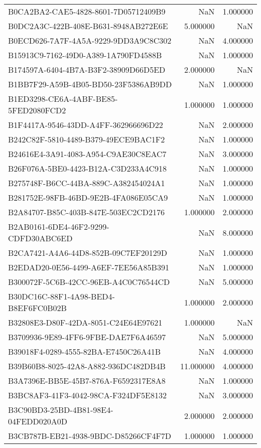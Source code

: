 \begin{tabular}{lrr}
B0CA2BA2-CAE5-4828-8601-7D05712409B9 & NaN & 1.000000 \\
B0DC2A3C-422B-408E-B631-8948AB272E6E & 5.000000 & NaN \\
B0ECD626-7A7F-4A5A-9229-9DD3A9C8C302 & NaN & 4.000000 \\
B15913C9-7162-49D0-A389-1A790FD4588B & NaN & 1.000000 \\
B174597A-6404-4B7A-B3F2-38909D66D5ED & 2.000000 & NaN \\
B1BB7F29-A59B-4B05-BD50-23F5386AB9DD & NaN & 1.000000 \\
B1ED3298-CE6A-4ABF-BE85-5FED2080FCD2 & 1.000000 & 1.000000 \\
B1F4417A-9546-43DD-A4FF-362966696D22 & NaN & 2.000000 \\
B242C82F-5810-4489-B379-49ECE9BAC1F2 & NaN & 1.000000 \\
B24616E4-3A91-4083-A954-C9AE30C8EAC7 & NaN & 3.000000 \\
B26F076A-5BE0-4423-B12A-C3D233A4C918 & NaN & 1.000000 \\
B275748F-B6CC-44BA-889C-A382454024A1 & NaN & 1.000000 \\
B281752E-98FB-46BD-9E2B-4FA086E05CA9 & NaN & 1.000000 \\
B2A84707-B85C-403B-847E-503EC2CD2176 & 1.000000 & 2.000000 \\
B2AB0161-6DE4-46F2-9299-CDFD30ABC6ED & NaN & 8.000000 \\
B2CA7421-A4A6-44D8-852B-09C7EF20129D & NaN & 1.000000 \\
B2EDAD20-0E56-4499-A6EF-7EE56A85B391 & NaN & 1.000000 \\
B300072F-5C6B-42CC-96EB-A4C0C76544CD & NaN & 5.000000 \\
B30DC16C-88F1-4A98-BED4-B8EF6FC0B02B & 1.000000 & 2.000000 \\
B32808E3-D80F-42DA-8051-C24E64E97621 & 1.000000 & NaN \\
B3709936-9E89-4FF6-9FBE-DAE7F6A46597 & NaN & 5.000000 \\
B39018F4-0289-4555-82BA-E7450C26A41B & NaN & 4.000000 \\
B39B60B8-8025-42A8-A882-936DC482DB4B & 11.000000 & 4.000000 \\
B3A7396E-BB5E-45B7-876A-F6592317E8A8 & NaN & 1.000000 \\
B3BC8AF3-41F3-4042-98CA-F324DF5E8132 & NaN & 3.000000 \\
B3C90BD3-25BD-4B81-98E4-04FEDD020A0D & 2.000000 & 2.000000 \\
B3CB787B-EB21-4938-9BDC-D85266CF4F7D & 1.000000 & 1.000000 \\

\end{tabular}
